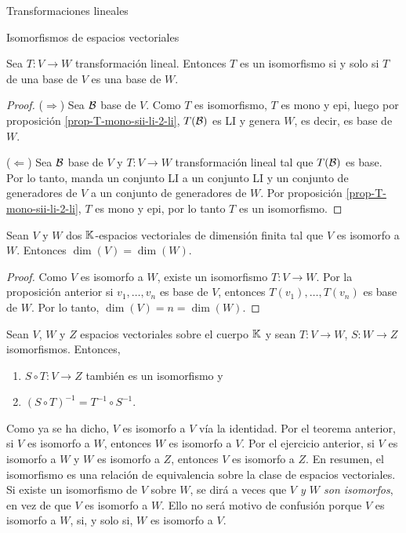 \begin{chapter}{Transformaciones lineales}
\begin{section}{Isomorfismos de espacios vectoriales}
        \begin{proposicion}
            Sea $T:V \to W$ transformación lineal. Entonces $T$ es un isomorfismo si y solo si $T$ de una base de $V$ es una base de $W$.
        \end{proposicion}
        \begin{proof} 

         ($\Rightarrow$) 
           Sea $ \mathcal{B}$ base de $V$.  Como $T$ es isomorfismo, $T$ es mono y epi, luego por proposición \ref{prop-T-mono-sii-li-2-li}, $T(\mathcal{B})$ es LI y genera $W$,  es decir,  es base de $W$.

           ($\Leftarrow$) Sea $ \mathcal{B}$ base de $V$ y $T:V \to W$ transformación lineal tal que $T(\mathcal{B})$ es base. Por lo tanto, manda un conjunto LI a un conjunto LI y un conjunto de generadores de $V$ a un conjunto de generadores de $W$. Por proposición \ref{prop-T-mono-sii-li-2-li}, $T$ es mono  y epi, por lo tanto $T$ es un isomorfismo.
        \end{proof}

        \begin{corolario}
            Sean $V$ y $W$ dos  $\mathbb K$-espacios vectoriales de dimensión finita tal que $V$ es isomorfo a $W$. Entonces $\dim(V) = \dim(W)$.
        \end{corolario}
        \begin{proof}
        Como $V$  es isomorfo  a $W$,  existe un isomorfismo $T: V \to W$. Por la proposición anterior si $v_1,\ldots,v_n$ es base de $V$,  entonces $T(v_1),\ldots,T(v_n)$ es base de $W$. Por lo tanto, $\dim(V) = n = \dim(W)$.
        \end{proof}

        \begin{ejercicio*} 
            Sean $V$, $W$ y $Z$ espacios vectoriales sobre el cuerpo $\mathbb K$ y sean $T:V \to W$, $S:W \to Z$ isomorfismos. Entonces, 
            \begin{enumerate}
                \item $S\circ T:V \to Z$  también es un isomorfismo y
                \item 	$(S\circ T)^{-1} = T^{-1}\circ S^{-1}$.
            \end{enumerate}
        \end{ejercicio*}

        Como ya se ha dicho, $V$ es isomorfo a $V$ vía la identidad. Por  el teorema anterior, si $V$ es isomorfo a $W$,  entonces $W$ es isomorfo a $V$. Por  el ejercicio anterior, si $V$ es isomorfo a $W$ y $W$ es isomorfo a $Z$, entonces $V$ es isomorfo a $Z$. En resumen, el isomorfismo es una relación de equivalencia sobre la clase de espacios vectoriales. Si existe un isomorfismo de $V$ sobre $W$, se dirá a veces que \textit{$V$ y $W$ son isomorfos}, en vez de que $V$ es isomorfo a $W$. Ello no será motivo de confusión porque $V$ es isomorfo a $W$, si, y solo si, $W$ es isomorfo a $V$.	
            

\end{section}
\end{chapter}

